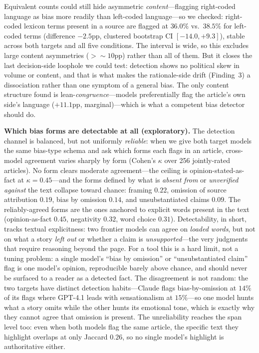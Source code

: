 \documentclass{article}
\newcommand{\kap}{\kappa}
\begin{document}
Equivalent counts could still hide asymmetric \emph{content}---flagging
right-coded language as bias more readily than left-coded language---so
we checked: right-coded lexicon terms present in a source are flagged at
$36.0\%$ vs.\ $38.5\%$ for left-coded terms (difference $-2.5$pp,
clustered bootstrap CI $[-14.0, +9.3]$), stable across both targets and
all five conditions. The interval is wide, so this excludes large content asymmetries
(${>}{\sim}10$pp) rather than all of them. But it closes the last
decision-side loophole we could test: detection shows no political skew
in volume or content, and that is what makes the rationale-side drift
(Finding~3) a dissociation rather than one symptom of a general bias.
The only content structure found is lean-\emph{congruence}---models
preferentially flag the article's own side's language ($+11.1$pp,
marginal)---which is what a competent bias detector should do.

\textbf{Which bias forms are detectable at all (exploratory).} The
detection channel is balanced, but not uniformly \emph{reliable}: when
we give both target models the same bias-type schema and ask which forms
each flags in an article, cross-model agreement varies sharply by form
(Cohen's $\kap$ over 256 jointly-rated articles). No form clears
moderate agreement---the ceiling is opinion-stated-as-fact at
$\kap{=}0.45$---and the forms defined by what is \emph{absent from} or
\emph{unverified against} the text collapse toward chance: framing
$0.22$, omission of source attribution $0.19$, bias by omission $0.14$,
and unsubstantiated claims $0.09$. The reliably-agreed forms are the ones
anchored to explicit words present in the text (opinion-as-fact $0.45$,
negativity $0.32$, word choice $0.31$). Detectability, in short, tracks
textual explicitness: two frontier models can agree on \emph{loaded
words}, but not on what a story \emph{left out} or whether a claim is
\emph{unsupported}---the very judgments that require reasoning beyond the
page. For a tool this is a hard limit, not a tuning problem: a
single model's ``bias by omission'' or ``unsubstantiated claim'' flag is
one model's opinion, reproducible barely above chance, and should never
be surfaced to a reader as a detected fact. The disagreement is not
random: the two targets have distinct detection habits---Claude flags
bias-by-omission at $14\%$ of its flags where GPT-4.1 leads with
sensationalism at $15\%$---so one model hunts what a story omits while
the other hunts its emotional tone, which is exactly why they cannot
agree that omission is present. The unreliability reaches the span
level too: even when both models flag the same article, the specific
text they highlight overlaps at only Jaccard $0.26$, so no single
model's highlight is authoritative either.
\end{document}
